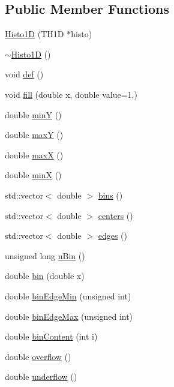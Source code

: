\subsection*{Public Member Functions}
\begin{DoxyCompactItemize}
\item 
\hyperlink{classHisto1D_aecd55af9b972863d5cee5a387746fb96}{Histo1D} (TH1D $\ast$histo)
\item 
\hyperlink{classHisto1D_af62825fd9266c1903d403e489501daa9}{$\sim$Histo1D} ()
\item 
void \hyperlink{classHisto1D_a22b820e2c706d8e8614c31962f1ac6d0}{def} ()
\item 
void \hyperlink{classHisto1D_a907707c720f8f0d3f582632d186ee7dd}{fill} (double x, double value=1.)
\item 
double \hyperlink{classHisto1D_a122c7071e060672dd2c08ad92212b3a2}{minY} ()
\item 
double \hyperlink{classHisto1D_a60a1095ac5fbab109d20c54c2ee569a3}{maxY} ()
\item 
double \hyperlink{classHisto1D_a54c7464513d1382c7c66fa880bfe568e}{maxX} ()
\item 
double \hyperlink{classHisto1D_abe9bf76799889414686794502e777b67}{minX} ()
\item 
std::vector$<$ double $>$ \hyperlink{classHisto1D_aaa8cd492ee25a3ad1b1694349fb1024c}{bins} ()
\item 
std::vector$<$ double $>$ \hyperlink{classHisto1D_a07fd41679a3255cdd44d4dcf8865adb7}{centers} ()
\item 
std::vector$<$ double $>$ \hyperlink{classHisto1D_a8c74413d35bce2e244defd470b6b4ebf}{edges} ()
\item 
unsigned long \hyperlink{classHisto1D_a7f3cf7364ae6e1eb9ba08b5ffe897d8f}{nBin} ()
\item 
double \hyperlink{classHisto1D_a2a8a7d93c2f10b73b490a6f550e00db4}{bin} (double x)
\item 
double \hyperlink{classHisto1D_aa15ab79f858358e3cafc0617eb668c2e}{binEdgeMin} (unsigned int)
\item 
double \hyperlink{classHisto1D_a7923d51b02056dbaef353b70c11499d0}{binEdgeMax} (unsigned int)
\item 
double \hyperlink{classHisto1D_aece5cb8dddafabe0029067dc3e4be878}{binContent} (int i)
\item 
double \hyperlink{classHisto1D_a5d13018047a4ffb15e662f44a0a3f520}{overflow} ()
\item 
double \hyperlink{classHisto1D_a3bac7a207b9ed5f828001119b2f14869}{underflow} ()

\end{DoxyCompactItemize}
